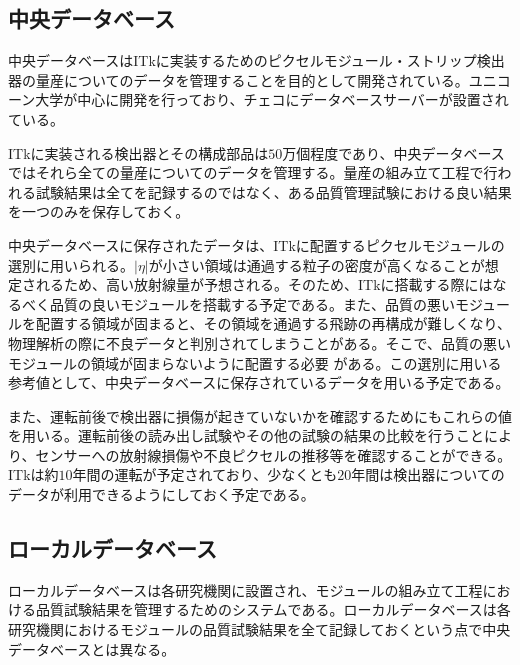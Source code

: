 \subsection{中央データベース}
\label{sec:ITkPD}

中央データベースはITkに実装するためのピクセルモジュール・ストリップ検出器の量産についてのデータを管理することを目的として開発されている。ユニコーン大学が中心に開発を行っており、チェコにデータベースサーバーが設置されている。

ITkに実装される検出器とその構成部品は$50$万個程度であり、中央データベースではそれら全ての量産についてのデータを管理する。量産の組み立て工程で行われる試験結果は全てを記録するのではなく、ある品質管理試験における良い結果を一つのみを保存しておく。

中央データベースに保存されたデータは、ITkに配置するピクセルモジュールの選別に用いられる。$|\eta|$が小さい領域は通過する粒子の密度が高くなることが想定されるため、高い放射線量が予想される。そのため、ITkに搭載する際にはなるべく品質の良いモジュールを搭載する予定である。また、品質の悪いモジュールを配置する領域が固まると、その領域を通過する飛跡の再構成が難しくなり、物理解析の際に不良データと判別されてしまうことがある。そこで、品質の悪いモジュールの領域が固まらないように配置する必要
がある。この選別に用いる参考値として、中央データベースに保存されているデータを用いる予定である。

また、運転前後で検出器に損傷が起きていないかを確認するためにもこれらの値を用いる。運転前後の読み出し試験やその他の試験の結果の比較を行うことにより、センサーへの放射線損傷や不良ピクセルの推移等を確認することができる。
ITkは約$10$年間の運転が予定されており、少なくとも$20$年間は検出器についてのデータが利用できるようにしておく予定である。



\subsection{ローカルデータベース}
\label{sec:LocalDB}

ローカルデータベースは各研究機関に設置され、モジュールの組み立て工程における品質試験結果を管理するためのシステムである。ローカルデータベースは各研究機関におけるモジュールの品質試験結果を全て記録しておくという点で中央データベースとは異なる。

